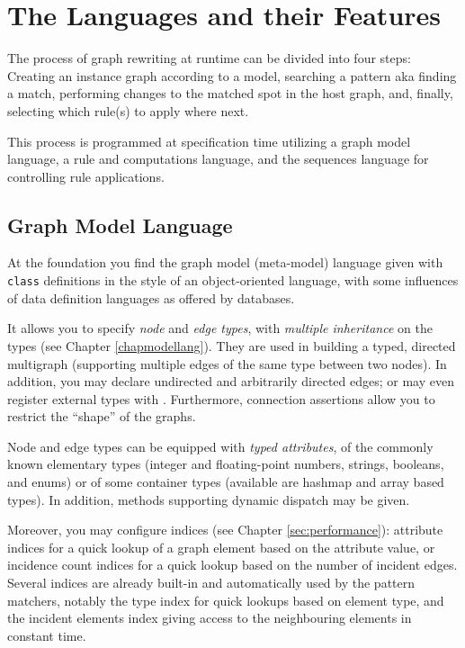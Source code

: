 \section{The Languages and their Features}

The process of graph rewriting at runtime can be divided into four steps:
Creating an instance graph according to a model,
searching a pattern aka finding a match,
performing changes to the matched spot in the host graph,
and, finally, selecting which rule(s) to apply where next.

This process is programmed at specification time utilizing a graph model language, a rule and computations language, and the sequences language for controlling rule applications.

\subsection{Graph Model Language}
At the foundation you find the graph model (meta-model) language given with \texttt{class} definitions in the style of an object-oriented language, with some influences of data definition languages as offered by databases. 

It allows you to specify \emph{node} and \emph{edge types}, with \emph{multiple inheritance} on the types (see Chapter \ref{chapmodellang}).
They are used in building a typed, directed multigraph (supporting multiple edges of the same type between two nodes).
In addition, you may declare undirected and arbitrarily directed edges; or may even register external types with \GrG.
Furthermore, connection assertions allow you to restrict the ``shape'' of the graphs.

Node and edge types can be equipped with \emph{typed attributes}, of the commonly known elementary types (integer and floating-point numbers, strings, booleans, and enums) or of some container types (available are hashmap and array based types).
In addition, methods supporting dynamic dispatch may be given.%

Moreover, you may configure indices (see Chapter \ref{sec:performance}): attribute indices for a quick lookup of a graph element based on the attribute value, or incidence count indices for a quick lookup based on the number of incident edges.
Several indices are already built-in and automatically used by the pattern matchers, notably the type index for quick lookups based on element type, and the incident elements index giving access to the neighbouring elements in constant time.

